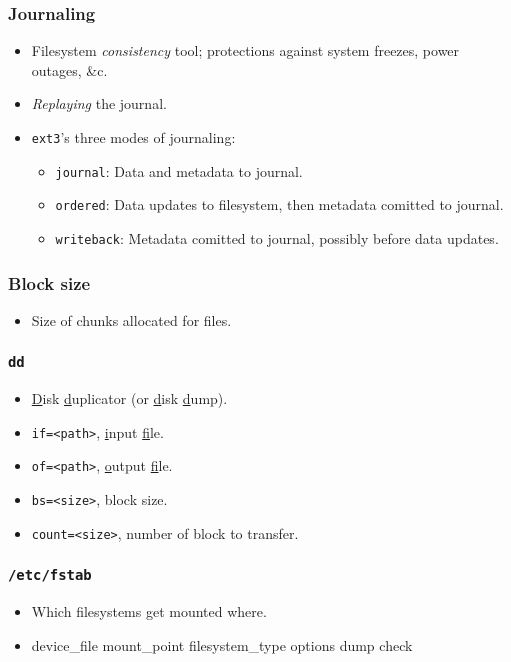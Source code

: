 \documentclass[xcolor={dvipsnames,svgnames},hyperref=dvips]{beamer}
\begin{document}
	\begin{frame}
		\frametitle{Journaling}
		\begin{itemize}
		\item Filesystem \emph{consistency} tool; protections against system freezes, power outages, \&c.
		\item \emph{Replaying} the journal.
		\item \texttt{ext3}'s three modes of journaling:
			\begin{itemize}
			\item \texttt{journal}: Data and metadata to journal.
			\item \texttt{ordered}: Data updates to filesystem, then metadata comitted to journal.
			\item \texttt{writeback}: Metadata comitted to journal, possibly before data updates.
			\end{itemize}
		\end{itemize}
	\end{frame}

	\begin{frame}
		\frametitle{Block size}
		\begin{itemize}
			\item Size of chunks allocated for files.
		\end{itemize}
	\end{frame}

	\begin{frame}
		\frametitle{\texttt{dd}}
		\begin{itemize}
			\item \underline{D}isk \underline{d}uplicator (or \underline{d}isk \underline{d}ump).
			\item \texttt{if=<path>}, \underline{i}nput \underline{f}ile.
			\item \texttt{of=<path>}, \underline{o}utput \underline{f}ile.
			\item \texttt{bs=<size>}, block size.
			\item \texttt{count=<size>}, number of block to transfer.
		\end{itemize}
	\end{frame}

	\begin{frame}
		\frametitle{\texttt{/etc/fstab}}
		\begin{itemize}
			\item Which filesystems get mounted where.
			\item device\_file mount\_point filesystem\_type options dump check
		\end{itemize}
	\end{frame}
\end{document}
